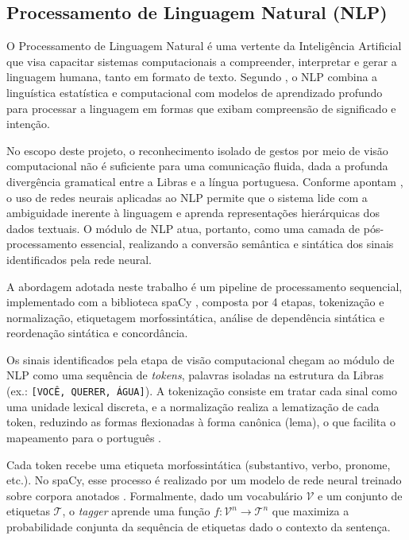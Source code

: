\documentclass[
    12pt,                %
    openright,           %
    oneside,             %
    a4paper,             %
    english,             %
    brazil               %
]{abntex2}
\begin{document}
\subsection{Processamento de Linguagem Natural (NLP)}

O Processamento de Linguagem Natural é uma vertente da Inteligência Artificial que visa capacitar sistemas computacionais a compreender, interpretar e gerar a linguagem humana, tanto em formato de texto. Segundo , o NLP combina a linguística estatística e computacional com modelos de aprendizado profundo para processar a linguagem em formas que exibam compreensão de significado e intenção.
 
No escopo deste projeto, o reconhecimento isolado de gestos por meio de visão computacional não é suficiente para uma comunicação fluida, dada a profunda divergência gramatical entre a Libras e a língua portuguesa. Conforme apontam , o uso de redes neurais aplicadas ao NLP permite que o sistema lide com a ambiguidade inerente à linguagem e aprenda representações hierárquicas dos dados textuais. O módulo de NLP atua, portanto, como uma camada de pós-processamento essencial, realizando a conversão semântica e sintática dos sinais identificados pela rede neural.
  
A abordagem adotada neste trabalho é um pipeline de processamento sequencial, implementado com a biblioteca spaCy \cite{Honnibal2020}, composta por 4 etapas, tokenização e normalização, etiquetagem morfossintática, análise de dependência sintática e reordenação sintática e concordância.
  
Os sinais identificados pela etapa de visão computacional chegam ao módulo de NLP como uma sequência de \textit{tokens}, palavras isoladas na estrutura da Libras (ex.: \texttt{[VOCÊ, QUERER, ÁGUA]}). A tokenização consiste em tratar cada sinal como uma unidade lexical discreta, e a normalização realiza a lematização de cada token, reduzindo as formas flexionadas à forma canônica (lema), o que facilita o mapeamento para o português \cite{Bird2009}.
 
Cada token recebe uma etiqueta morfossintática (substantivo, verbo, pronome, etc.). No spaCy, esse processo é realizado por um modelo de rede neural treinado sobre corpora anotados \cite{Honnibal2020}. Formalmente, dado um vocabulário $\mathcal{V}$ e um conjunto de etiquetas $\mathcal{T}$, o \textit{tagger} aprende uma função $f: \mathcal{V}^n \rightarrow \mathcal{T}^n$ que maximiza a probabilidade conjunta da sequência de etiquetas dado o contexto da sentença.
 
\end{document}
